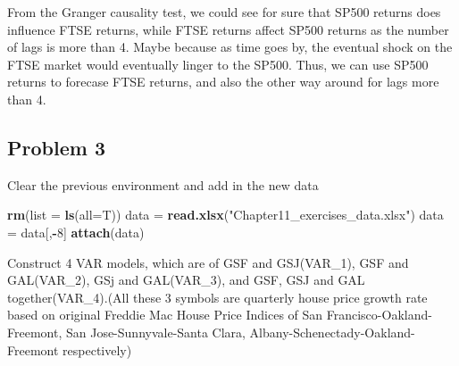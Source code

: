\documentclass[]{article}
\newenvironment{Shaded}{\begin{snugshade}}{\end{snugshade}}
\newcommand{\KeywordTok}[1]{\textcolor[rgb]{0.13,0.29,0.53}{\textbf{#1}}}
\newcommand{\DataTypeTok}[1]{\textcolor[rgb]{0.13,0.29,0.53}{#1}}
\newcommand{\DecValTok}[1]{\textcolor[rgb]{0.00,0.00,0.81}{#1}}
\newcommand{\StringTok}[1]{\textcolor[rgb]{0.31,0.60,0.02}{#1}}
\newcommand{\OperatorTok}[1]{\textcolor[rgb]{0.81,0.36,0.00}{\textbf{#1}}}
\newcommand{\NormalTok}[1]{#1}
\begin{document}
From the Granger causality test, we could see for sure that SP500
returns does influence FTSE returns, while FTSE returns affect SP500
returns as the number of lags is more than 4. Maybe because as time goes
by, the eventual shock on the FTSE market would eventually linger to the
SP500. Thus, we can use SP500 returns to forecase FTSE returns, and also
the other way around for lags more than 4.

\subsection{Problem 3}\label{problem-3}

Clear the previous environment and add in the new data

\begin{Shaded}
\begin{Highlighting}[]
\KeywordTok{rm}\NormalTok{(}\DataTypeTok{list =} \KeywordTok{ls}\NormalTok{(}\DataTypeTok{all=}\NormalTok{T))}
\NormalTok{data =}\StringTok{ }\KeywordTok{read.xlsx}\NormalTok{(}\StringTok{"Chapter11_exercises_data.xlsx"}\NormalTok{)}
\NormalTok{data =}\StringTok{ }\NormalTok{data[,}\OperatorTok{-}\DecValTok{8}\NormalTok{]}
\KeywordTok{attach}\NormalTok{(data)}
\end{Highlighting}
\end{Shaded}

Construct 4 VAR models, which are of GSF and GSJ(VAR\_1), GSF and
GAL(VAR\_2), GSj and GAL(VAR\_3), and GSF, GSJ and GAL
together(VAR\_4).(All these 3 symbols are quarterly house price growth
rate based on original Freddie Mac House Price Indices of San
Francisco-Oakland-Freemont, San Jose-Sunnyvale-Santa Clara,
Albany-Schenectady-Oakland-Freemont respectively)
\end{document}

